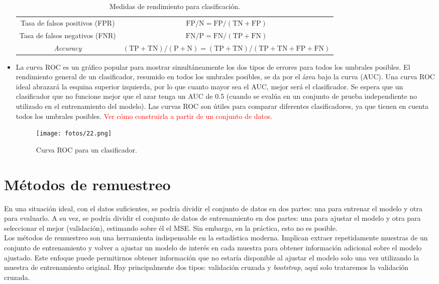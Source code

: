 \begin{itemize}
\begin{table}[h]
{\begin{tabular}{c|c}
Tasa de falsos positivos (FPR) & $\text{FP}/\text{N} = \text{FP}/(\text{TN} + \text{FP})$ \\ 
Tasa de falsos negativos (FNR) & $\text{FN}/\text{P} = \text{FN}/(\text{TP} + \text{FN})$ \\ 
\textit{Accuracy} & $(\text{TP} + \text{TN})/(\text{P} + \text{N}) = (\text{TP} + \text{TN})/(\text{TP} + \text{TN} + \text{FP} + \text{FN})$ \\ \hline
\end{tabular}
}
\caption{Medidas de rendimiento para clasificación.}
\label{tb:4.7}
\end{table}
\item La curva ROC es un gráfico popular para mostrar simultáneamente los dos tipos de errores para todos los umbrales posibles. El rendimiento general de un clasificador, resumido en todos los umbrales posibles, se da por el área bajo la curva (AUC). Una curva ROC ideal abrazará la esquina superior izquierda, por lo que cuanto mayor sea el AUC, mejor será el clasificador. Se espera que un clasificador que no funcione mejor que el azar tenga un AUC de 0.5 (cuando se evalúa en un conjunto de prueba independiente no utilizado en el entrenamiento del modelo). Las curvas ROC son útiles para comparar diferentes clasificadores, ya que tienen en cuenta todos los umbrales posibles. \textcolor{red}{Ver cómo construirla a partir de un conjunto de datos.} 
\begin{figure}[h]
\centering
\texttt{[image: fotos/22.png]}
\caption{Curva ROC para un clasificador.}
\end{figure}
\end{itemize}

\section{Métodos de remuestreo}

En una situación ideal, con el datos suficientes, se podría dividir el conjunto de datos en dos partes: una para entrenar el modelo y otra para evaluarlo. A su vez, se podría dividir el conjunto de datos de entrenamiento en dos partes: una para ajustar el modelo y otra para seleccionar el mejor (validación), estimando sobre él el MSE. Sin embargo, en la práctica, esto no es posible. \\

Los métodos de remuestreo son una herramienta indispensable en la estadística moderna. Implican extraer repetidamente muestras de un conjunto de entrenamiento y volver a ajustar un modelo de interés en cada muestra para obtener información adicional sobre el modelo ajustado. Este enfoque puede permitirnos obtener información que no estaría disponible al ajustar el modelo solo una vez utilizando la muestra de entrenamiento original. Hay principalmente dos tipos: validación cruzada y \textit{bootstrap}, aquí solo trataremos la validación cruzada.

